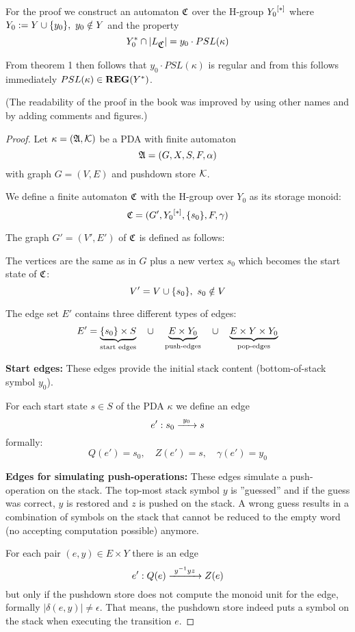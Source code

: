 For the proof we construct an automaton $\mbox{$\mathfrak{C}$}$ over the H-group $\mbox{${Y_0}^{[*]}$}$
where $Y_0 := Y \cup \mbox{$\{y_0\}$},\ y_0 \notin Y$ and the property
\[ Y_0^* \cap |L_{\mbox{$\mathfrak{C}$}}| = y_0 \cdot PSL(\kappa) \]

From theorem 1 then follows that $y_0 \cdot PSL(\kappa)$ is regular and from
this follows immediately $PSL(\kappa) \in \mbox{{\bf REG}}(Y^*)$.

(The readability of the proof in the book was improved by using other names and
by adding comments and figures.)

\begin{proof}
Let $\kappa = (\mbox{$\mathfrak{A}$}, \mbox{$\mathcal{K}$})$ be a PDA with finite automaton
\[ \mbox{$\mathfrak{A}$} = (G, X, S, F, \alpha) \]
with graph $G = (V, E)$ and pushdown store $\mbox{$\mathcal{K}$}$.

We define a finite automaton $\mbox{$\mathfrak{C}$}$ with the H-group over $Y_0$ as its storage
monoid:
\[ \mbox{$\mathfrak{C}$} = (G', \mbox{${Y_0}^{[*]}$}, \mbox{$\{s_0\}$}, F, \gamma) \]

The graph $G'=(V',E')$ of $\mbox{$\mathfrak{C}$}$ is defined as follows:

The vertices are the same as in $G$ plus a new vertex $s_0$ which becomes the
start state of $\mbox{$\mathfrak{C}$}$:
\[ V' = V \cup \mbox{$\{s_0\}$},\ s_0 \notin V \]

The edge set $E'$ contains three different types of edges:
\[ E' = \underbrace{\mbox{$\{s_0\}$} \times S}_{\text{start edges}} \quad\cup\quad
\underbrace{E \times Y_0}_{\text{push-edges}} \quad\cup\quad \underbrace{E
\times Y \times Y_0}_{\text{pop-edges}}
\]

{\bf Start edges:} These edges provide the initial
stack content (bottom-of-stack symbol $y_0$).

For each start state $s \in S$ of the PDA $\kappa$ we define an edge
\[ e': s_0 \xrightarrow{\ {y_0}\ } s\]
formally:
\[ Q(e') = s_0,\quad Z(e') = s,\quad \gamma(e') = y_0 \]

\bigskip
{\bf Edges for simulating push-operations:} These edges simulate a
push-operation on the stack.
The top-most stack symbol $y$ is ''guessed'' and if the guess was correct, $y$ is
restored and $z$ is pushed on the stack. A wrong guess results in a combination of symbols on 
the stack that cannot be reduced to the empty word (no accepting computation
possible) anymore.
 
For each pair $(e, y) \in E \times Y$ there is an edge
\[ e': Q(e) \xrightarrow{\ {y^{-1} y z}\ } Z(e)\]
but only if the pushdown store does not compute the monoid unit for the edge,
formally $|\delta(e, y)| \neq \epsilon$. That means, the pushdown store indeed
puts a symbol on the stack when executing the transition $e$.


\end{proof}
